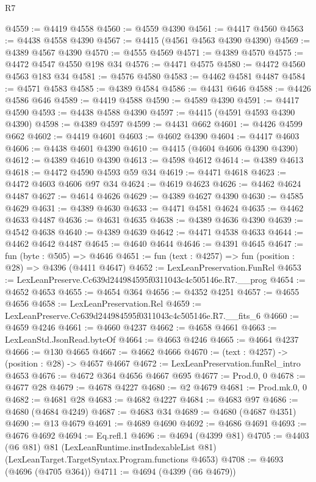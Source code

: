 \begin{lexlean}{R7}
\begin{coremodule}
@4559 := @4419 @4558
@4560 := @4559 @4390
@4561 := @4417 @4560
@4563 := @4438 @4558 @4390
@4567 := @4415 (@4561 @4563 @4390 @4390)
@4569 := @4389 @4567 @4390
@4570 := @4555 @4569
@4571 := @4389 @4570
@4575 := @4472 @4547 @4550 @198 @34
@4576 := @4471 @4575
@4580 := @4472 @4560 @4563 @183 @34
@4581 := @4576 @4580
@4583 := @4462 @4581 @4487
@4584 := @4571 @4583
@4585 := @4389 @4584
@4586 := @4431 @646
@4588 := @4426 @4586 @646
@4589 := @4419 @4588
@4590 := @4589 @4390
@4591 := @4417 @4590
@4593 := @4438 @4588 @4390
@4597 := @4415 (@4591 @4593 @4390 @4390)
@4598 := @4389 @4597
@4599 := @4431 @662
@4601 := @4426 @4599 @662
@4602 := @4419 @4601
@4603 := @4602 @4390
@4604 := @4417 @4603
@4606 := @4438 @4601 @4390
@4610 := @4415 (@4604 @4606 @4390 @4390)
@4612 := @4389 @4610 @4390
@4613 := @4598 @4612
@4614 := @4389 @4613
@4618 := @4472 @4590 @4593 @59 @34
@4619 := @4471 @4618
@4623 := @4472 @4603 @4606 @97 @34
@4624 := @4619 @4623
@4626 := @4462 @4624 @4487
@4627 := @4614 @4626
@4629 := @4389 @4627 @4390
@4630 := @4585 @4629
@4631 := @4389 @4630
@4633 := @4471 @4581 @4624
@4635 := @4462 @4633 @4487
@4636 := @4631 @4635
@4638 := @4389 @4636 @4390
@4639 := @4542 @4638
@4640 := @4389 @4639
@4642 := @4471 @4538 @4633
@4644 := @4462 @4642 @4487
@4645 := @4640 @4644
@4646 := @4391 @4645
@4647 := fun (byte : @505) => @4646
@4651 := fun (text : @4257) => fun (position : @28) => @4396 (@4411 @4647)
@4652 := LexLeanPreservation.FunRel
@4653 := LexLeanPreserve.Cc639d244984595f0311043c4c505146e.R7.__prog
@4654 := @4652 @4653
@4655 := @4654 @364
@4656 := @4352 @4251
@4657 := @4655 @4656
@4658 := LexLeanPreservation.Rel
@4659 := LexLeanPreserve.Cc639d244984595f0311043c4c505146e.R7.__fits_6
@4660 := @4659 @4246
@4661 := @4660 @4237
@4662 := @4658 @4661
@4663 := LexLeanStd.JsonRead.byteOf
@4664 := @4663 @4246
@4665 := @4664 @4237
@4666 := @130 @4665
@4667 := @4662 @4666
@4670 := (text : @4257) -> (position : @28) -> @4657 @4667
@4672 := LexLeanPreservation.funRel_intro @4653
@4676 := @4672 @364 @4656 @4667 @695
@4677 := Prod.{0, 0}
@4678 := @4677 @28
@4679 := @4678 @4227
@4680 := @2 @4679
@4681 := Prod.mk.{0, 0}
@4682 := @4681 @28
@4683 := @4682 @4227
@4684 := @4683 @97
@4686 := @4680 (@4684 @4249)
@4687 := @4683 @34
@4689 := @4680 (@4687 @4351)
@4690 := @13 @4679
@4691 := @4689 @4690
@4692 := @4686 @4691
@4693 := @4676 @4692
@4694 := Eq.refl.{1}
@4696 := @4694 (@4399 @81)
@4705 := @4403
    (@6 @81)
    @81
    (LexLeanRuntime.instIndexableList @81)
    (LexLeanTarget.TargetSyntax.Program.functions @4653)
@4708 := @4693 (@4696 (@4705 @364))
@4711 := @4694 (@4399 (@6 @4679))

\end{coremodule}
\end{lexlean}
